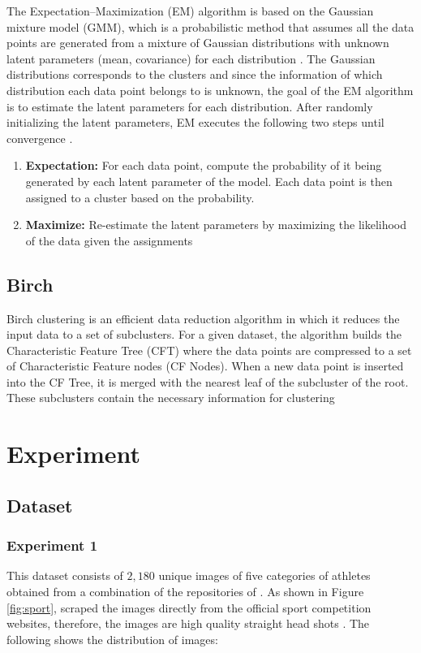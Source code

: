 \documentclass[12pt,english]{article}
\begin{document}
The Expectation–Maximization (EM) algorithm is based on the Gaussian mixture model (GMM), which is a probabilistic method that assumes all the data points are generated from a mixture of Gaussian distributions with unknown latent parameters (mean, covariance) for each distribution \cite{scikit-learn}. The Gaussian distributions corresponds to the clusters and since the information of which distribution each data point belongs to is unknown, the goal of the EM algorithm is to estimate the latent parameters for each distribution. After randomly initializing the latent parameters, EM executes the following two steps until convergence \cite{scikit-learn}.

\begin{enumerate}
\item \textbf{Expectation: } For each data point, compute the probability of it being generated by each latent parameter of the model. Each data point is then assigned to a cluster based on the probability.

\item \textbf{Maximize: } Re-estimate the latent parameters by maximizing the likelihood of the data given the assignments 

\end{enumerate}

\subsection{Birch}
\quad
Birch clustering is an efficient data reduction algorithm in which it reduces the input data to a set of subclusters. For a given dataset, the algorithm builds the Characteristic Feature Tree (CFT) where the data points are compressed to a set of  Characteristic Feature nodes (CF Nodes). When a new data point is inserted into the CF Tree, it is merged with the nearest leaf of the subcluster of the root. These subclusters contain the necessary information for clustering \cite{scikit-learn}

\section{Experiment}
\label{experiment}

\subsection{Dataset}

\subsubsection{Experiment 1}
\label{experiment1}
\quad
This dataset consists of $2,180$ unique images of five categories of athletes obtained from a combination of the repositories of \cite{data1}. As shown in Figure \ref{fig:sport}, \cite{data1} scraped the images directly from the official sport competition websites, therefore, the images are high quality straight head shots \cite{data1}. The following shows the distribution of images:
\end{document}
